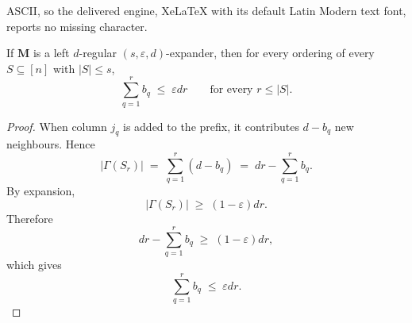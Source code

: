 \documentclass[10pt,a4paper]{amsart}
\begin{document}
ASCII, so the delivered engine, XeLaTeX with its default Latin Modern text font, reports no missing character.
\begin{lemma}
\label{lem:prefix_collision_bound}
If $\mathbf{M}$ is a left $d$-regular $(s, \varepsilon, d)$-expander, then for every ordering of every $S \subseteq [n]$ with $|S| \le s$,
\[
    \sum_{q=1}^r b_q
    \;\le\;
    \varepsilon d r
    \qquad
    \text{for every } r \le |S|.
\]
\end{lemma}

\begin{proof}
When column $j_q$ is added to the prefix, it contributes $d - b_q$ new neighbours. Hence
\[
    |\Gamma(S_r)|
    \;=\;
    \sum_{q=1}^r (d - b_q)
    \;=\;
    dr - \sum_{q=1}^r b_q.
\]
By expansion,
\[
    |\Gamma(S_r)|
    \;\ge\;
    (1 - \varepsilon) dr.
\]
Therefore
\[
    dr - \sum_{q=1}^r b_q
    \;\ge\;
    (1 - \varepsilon) dr,
\]
which gives
\[
    \sum_{q=1}^r b_q
    \;\le\;
    \varepsilon d r.
\]
\end{proof}
\end{document}
